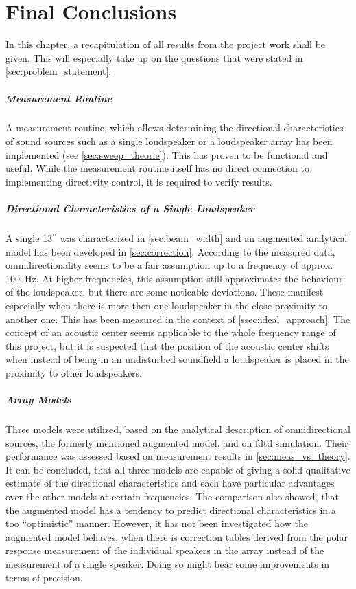 \chapter{Final Conclusions}
In this chapter, a recapitulation of all results from the project work shall be given. This will especially take up on the questions that were stated in \autoref{sec:problem_statement}.\\
\paragraph{Measurement Routine}
A measurement routine, which allows determining the directional characteristics of sound sources such as a single loudspeaker or a loudspeaker array has been implemented (see \autoref{sec:sweep_theorie}). This has proven to be functional and useful. While the measurement routine itself has no direct connection to implementing directivity control, it is required to verify results.
\paragraph{Directional Characteristics of a Single Loudspeaker}
A single 13$^{\prime \prime}$  was characterized in \autoref{sec:beam_width} and an augmented analytical model has been developed in \autoref{sec:correction}. According to the measured data, omnidirectionality seems to be a fair assumption up to a frequency of approx. \SI{100}{\hertz}. At higher frequencies, this assumption still approximates the behaviour of the loudspeaker, but there are some noticable deviations. These manifest especially when there is more then one loudspeaker in the close proximity to another one. This has been measured in the context of \autoref{ssec:ideal_approach}. The concept of an acoustic center seems applicable to the whole frequency range of this project, but it is suspected that the position of the acoustic center shifts when instead of being in an undisturbed soundfield a loudspeaker is placed in the proximity to other loudspeakers.
\paragraph{Array Models}
Three models were utilized, based on the analytical description of omnidirectional sources, the formerly mentioned augmented model, and on \gls{fdtd} simulation. Their performance was assessed based on measurement results in \autoref{sec:meas_vs_theory}. It can be concluded, that all three models are capable of giving a solid qualitative estimate of the directional characteristics and each have particular advantages over the other models at certain frequencies. The comparison also showed, that the augmented model has a tendency to predict directional characteristics in a too ``optimistic'' manner. However, it has not been investigated how the augmented model behaves, when there is correction tables derived from the polar response measurement of the individual speakers in the array instead of the measurement of a single speaker. Doing so might bear some improvements in terms of precision.
